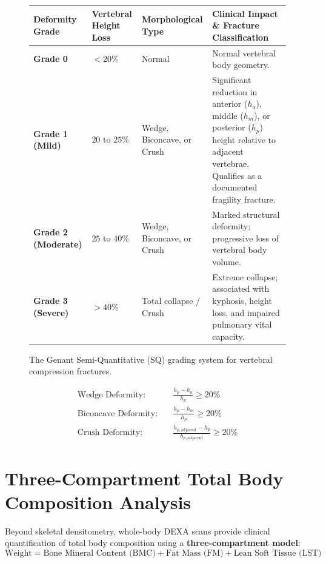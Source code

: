 \documentclass[11pt,a4paper]{article}
\begin{document}
\begin{figure}[htbp]
\centering
\setlength{\tabcolsep}{4pt}
\begin{tabular}{p{2.8cm}p{3.2cm}p{3.6cm}p{5.0cm}}
\toprule
\textbf{Deformity Grade} & \textbf{Vertebral Height Loss} & \textbf{Morphological Type} & \textbf{Clinical Impact \& Fracture Classification} \\
\midrule
\textbf{Grade 0} & $< 20\%$ & Normal & Normal vertebral body geometry. \\
\addlinespace
\textbf{Grade 1 (Mild)} & $20\text{ to }25\%$ & Wedge, Biconcave, or Crush & Significant reduction in anterior ($h_a$), middle ($h_m$), or posterior ($h_p$) height relative to adjacent vertebrae. Qualifies as a documented fragility fracture. \\
\addlinespace
\textbf{Grade 2 (Moderate)} & $25\text{ to }40\%$ & Wedge, Biconcave, or Crush & Marked structural deformity; progressive loss of vertebral body volume. \\
\addlinespace
\textbf{Grade 3 (Severe)} & $> 40\%$ & Total collapse / Crush & Extreme collapse; associated with kyphosis, height loss, and impaired pulmonary vital capacity. \\
\bottomrule
\end{tabular}
\caption{The Genant Semi-Quantitative (SQ) grading system for vertebral compression fractures.}
\label{tab:genant_grading}
\end{figure}

\begin{align}
    \text{Wedge Deformity:} \quad & \frac{h_p - h_a}{h_p} \ge 20\% \\
    \text{Biconcave Deformity:} \quad & \frac{h_p - h_m}{h_p} \ge 20\% \\
    \text{Crush Deformity:} \quad & \frac{h_{p,\text{adjacent}} - h_p}{h_{p,\text{adjacent}}} \ge 20\%
\end{align}

\newpage
\section{Three-Compartment Total Body Composition Analysis}

Beyond skeletal densitometry, whole-body DEXA scans provide clinical quantification of total body composition using a \textbf{three-compartment model}:
\begin{equation}
    \text{Weight} = \text{Bone Mineral Content (BMC)} + \text{Fat Mass (FM)} + \text{Lean Soft Tissue (LST)}
\end{equation}
\end{document}
